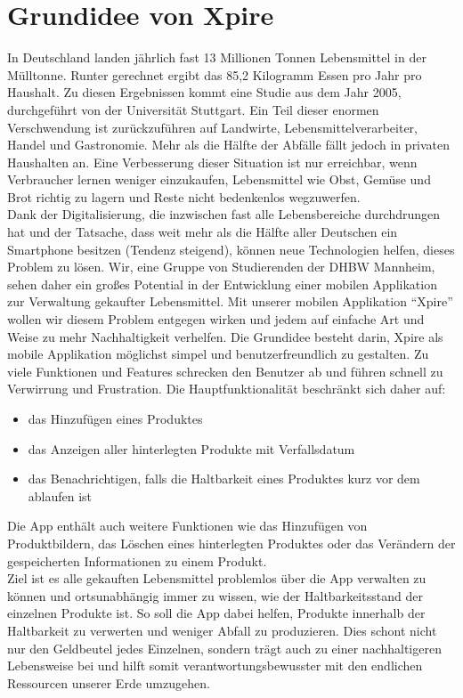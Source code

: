 \section{Grundidee von Xpire}
In Deutschland landen jährlich fast 13 Millionen Tonnen Lebensmittel in der Mülltonne. Runter gerechnet ergibt das 85,2 Kilogramm Essen pro Jahr pro Haushalt. Zu diesen Ergebnissen kommt eine Studie aus dem Jahr 2005, durchgeführt von der Universität Stuttgart.\autocite[vgl.][]{UniversitatStuttgart.2012} Ein Teil dieser enormen Verschwendung ist zurückzuführen auf Landwirte, Lebensmittelverarbeiter, Handel und Gastronomie. Mehr als die Hälfte der Abfälle fällt jedoch in privaten Haushalten an. Eine Verbesserung dieser Situation ist nur erreichbar, wenn Verbraucher lernen weniger einzukaufen, Lebensmittel wie Obst, Gemüse und Brot richtig zu lagern und Reste nicht bedenkenlos wegzuwerfen.\\
Dank der Digitalisierung, die inzwischen fast alle Lebensbereiche durchdrungen hat und der Tatsache, dass weit mehr als die Hälfte aller Deutschen ein Smartphone besitzen (Tendenz steigend), können neue Technologien helfen, dieses Problem zu lösen. Wir, eine Gruppe von Studierenden der DHBW Mannheim, sehen daher ein großes Potential in der Entwicklung einer mobilen Applikation zur Verwaltung gekaufter Lebensmittel. Mit unserer mobilen Applikation \enquote{Xpire} wollen wir diesem Problem entgegen wirken und jedem auf einfache Art und Weise zu mehr Nachhaltigkeit verhelfen.
Die Grundidee besteht darin, Xpire als mobile Applikation möglichst simpel und benutzerfreundlich zu gestalten. Zu viele Funktionen und Features schrecken den Benutzer ab und führen schnell zu Verwirrung und Frustration. Die Hauptfunktionalität beschränkt sich daher auf:
\begin{itemize}[noitemsep]
	\item das Hinzufügen eines Produktes
	\item das Anzeigen aller hinterlegten Produkte mit Verfallsdatum
	\item das Benachrichtigen, falls die Haltbarkeit eines Produktes kurz vor dem ablaufen ist
\end{itemize}
Die App enthält auch weitere Funktionen wie das Hinzufügen von Produktbildern, das Löschen eines hinterlegten Produktes oder das Verändern der gespeicherten  Informationen zu einem Produkt.\\
Ziel ist es alle gekauften Lebensmittel problemlos über die App verwalten zu können und ortsunabhängig immer zu wissen, wie der Haltbarkeitsstand der einzelnen Produkte ist. So soll die App dabei helfen, Produkte innerhalb der Haltbarkeit zu verwerten und weniger Abfall zu produzieren. Dies schont nicht nur den Geldbeutel jedes Einzelnen, sondern trägt auch zu einer nachhaltigeren Lebensweise bei und hilft somit verantwortungsbewusster mit den endlichen Ressourcen unserer Erde umzugehen.

